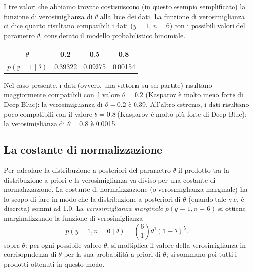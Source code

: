 \documentclass[
  10pt,
  italian,
  a4paper,
  extrafontsizes,onecolumn,openright
  ]{memoir}
\begin{document}
I tre valori che abbiamo trovato costisuiscono (in questo esempio semplificato) la funzione di verosimiglianza di \(\theta\) alla luce dei dati. La funzione di verosimiglianza ci dice quanto risultano compatibili i dati (\(y = 1\), \(n = 6\)) con i possibili valori del parametro \(\theta\), considerato il modello probabilistico binomiale.

\begin{longtable}[]{@{}cccc@{}}
\toprule
\(\theta\) & 0.2 & 0.5 & 0.8 \\
\midrule
\endhead
\(p(y = 1 \mid \theta)\) & 0.39322 & 0.09375 & 0.00154 \\
\bottomrule
\end{longtable}

Nel caso presente, i dati (ovvero, una vittoria su sei partite) risultano maggiormente compatibili con il valore \(\theta = 0.2\) (Kasparov è molto meno forte di Deep Blue): la verosimiglianza di \(\theta = 0.2\) è 0.39. All'altro estremo, i dati risultano poco compatibili con il valore \(\theta = 0.8\) (Kasparov è molto più forte di Deep Blue): la verosimiglianza di \(\theta = 0.8\) è 0.0015.

\hypertarget{la-costante-di-normalizzazione}{%
\subsection{La costante di normalizzazione}\label{la-costante-di-normalizzazione}}

Per calcolare la distribuzione a posteriori del parametro \(\theta\) il prodotto tra la distribuzione a priori e la verosimiglianza va diviso per una costante di normalizzazione. La costante di normalizzazione (o verosimiglianza marginale) ha lo scopo di fare in modo che la distribuzione a posteriori di \(\theta\) (quando tale v.c. è discreta) sommi ad 1.0. La \emph{verosimiglianza marginale} \(p(y = 1, n = 6)\) si ottiene marginalizzando la funzione di verosimiglianza
\[
p(y = 1, n = 6 \mid \theta) = \binom{6}{1} \theta^{1} (1-\theta)^{5}.
\]
sopra \(\theta\): per ogni possibile valore \(\theta\), si moltiplica il valore della verosimiglianza in corrisopndenza di \(\theta\) per la sua probabilità a priori di \(\theta\); si sommano poi tutti i prodotti ottenuti in questo modo.
\end{document}
